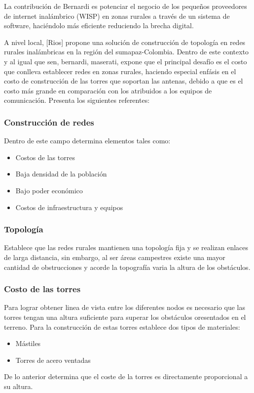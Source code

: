 \documentclass[]{article}
\providecommand{\tightlist}{%
  \setlength{\itemsep}{0pt}\setlength{\parskip}{0pt}}
\begin{document}
La contribución de Bernardi es potenciar el negocio de los pequeños
proveedores de internet inalámbrico (WISP) en zonas rurales a través de
un sistema de software, haciéndolo más eficiente reduciendo la brecha
digital.

A nivel local, {[}Rios{]} propone una solución de construcción de
topología en redes rurales inalámbricas en la región del
sumapaz-Colombia. Dentro de este contexto y al igual que sen, bernardi,
maserati, expone que el principal desafío es el costo que conlleva
establecer redes en zonas rurales, haciendo especial enfásis en el costo
de construcción de las torres que soportan las antenas, debido a que es
el costo más grande en comparación con los atribuidos a los equipos de
comunicación. Presenta los siguientes referentes:

\subsubsection{Construcción de redes}\label{construcciuxf3n-de-redes}

Dentro de este campo determina elementos tales como:

\begin{itemize}
\tightlist
\item
  Costos de las torres
\item
  Baja densidad de la población
\item
  Bajo poder económico
\item
  Costos de infraestructura y equipos
\end{itemize}

\subsubsection{Topología}\label{topologuxeda}

Establece que las redes rurales mantienen una topología fija y se
realizan enlaces de larga distancia, sin embargo, al ser áreas
campestres existe una mayor cantidad de obstrucciones y acorde la
topografía varia la altura de los obstáculos.

\subsubsection{Costo de las torres}\label{costo-de-las-torres}

Para lograr obtener linea de vista entre los diferentes nodos es
necesario que las torres tengan una altura suficiente para superar los
obstáculos oresentados en el terreno. Para la construcción de estas
torres establece dos tipos de materiales:

\begin{itemize}
\tightlist
\item
  Mástiles
\item
  Torres de acero ventadas
\end{itemize}

De lo anterior determina que el coste de la torres es directamente
proporcional a su altura.
\end{document}
